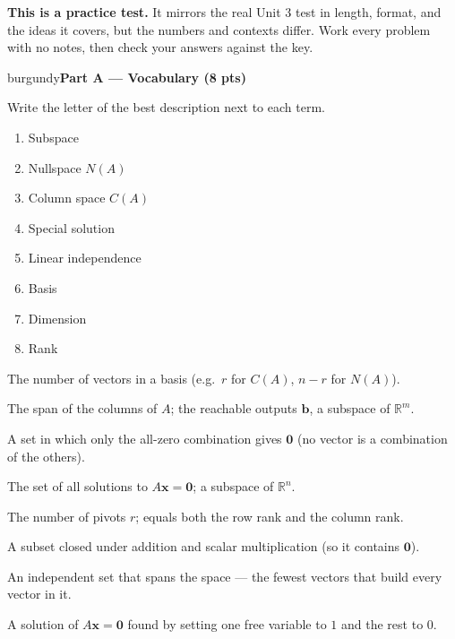 \documentclass[10pt]{article}
\newcommand{\bb}{\mathbf{b}}
\newcommand{\xx}{\mathbf{x}}
\newcommand{\zero}{\mathbf{0}}
\newcommand{\parthead}[1]{%
  \vspace{6pt}\noindent
  \begin{headlinebox}{burgundy}{\color{white}\bfseries #1}\end{headlinebox}%
  \vspace{4pt}}
\begin{document}
\namedateperiod

\vspace{0.10in}
\begin{remindbox}
\small
\textbf{This is a practice test.} It mirrors the real Unit 3 test in length, format,
and the ideas it covers, but the numbers and contexts differ. Work every problem
with no notes, then check your answers against the key.
\end{remindbox}

\parthead{Part A --- Vocabulary (8 pts)}
Write the letter of the best description next to each term.

\vspace{4pt}
\noindent
\begin{minipage}[t]{0.40\textwidth}
\begin{enumerate}[leftmargin=2.2em, itemsep=7pt, label=\arabic*.]
  \item Subspace 
  \item Nullspace $N(A)$ 
  \item Column space $C(A)$ 
  \item Special solution 
  \item Linear independence 
  \item Basis 
  \item Dimension 
  \item Rank 
\end{enumerate}
\end{minipage}%
\hfill
\begin{minipage}[t]{0.57\textwidth}
\small
\begin{description}[leftmargin=1.4em, itemsep=3pt]
  \item[(A)] The number of vectors in a basis (e.g.\ $r$ for $C(A)$, $n-r$ for $N(A)$).
  \item[(B)] The span of the columns of $A$; the reachable outputs $\bb$, a subspace of $\mathbb{R}^m$.
  \item[(C)] A set in which only the all-zero combination gives $\zero$ (no vector is a combination of the others).
  \item[(D)] The set of all solutions to $A\xx=\zero$; a subspace of $\mathbb{R}^n$.
  \item[(E)] The number of pivots $r$; equals both the row rank and the column rank.
  \item[(F)] A subset closed under addition and scalar multiplication (so it contains $\zero$).
  \item[(G)] An independent set that spans the space --- the fewest vectors that build every vector in it.
  \item[(H)] A solution of $A\xx=\zero$ found by setting one free variable to $1$ and the rest to $0$.
\end{description}
\end{minipage}
\end{document}
